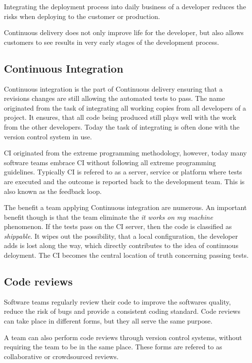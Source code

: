 Integrating the deployment process into daily business of a developer reduces
the risks when deploying to the customer or production.

Continuous delivery does not only improve life for the developer, but also
allows customers to see results in very early stages of the development
process.

\subsection{Continuous Integration}

Continuous integration is the part of Continuous delivery ensuring that a
revisions changes are still allowing the automated tests to pass. The name
originated from the task of integrating all working copies from all developers
of a project. It ensures, that all code being produced still plays well with
the work from the other developers. Today the task of integrating is often done
with the version control system in use.

CI originated from the extreme programming methodology, however, today many
software teams embrace CI without following all extreme programming guidelines.
Typically CI is refered to as a server, service or platform where tests are
executed and the outcome is reported back to the development team. This is also
known as the feedback loop.

The benefit a team applying Continuous integration are numerous. An important
benefit though is that the team eliminate the \textit{it works on my machine}
phenomenon. If the tests pass on the CI server, then the code is classified as
\textit{shippable}. It wipes out the possibility, that a local configuration,
the developer adds is lost along the way, which directly contributes to the
idea of continuous deloyment. The CI becomes the central location of truth
concerning passing tests.

\subsection{Code reviews}

Software teams regularly review their code to improve the softwares quality,
reduce the risk of bugs and provide a consistent coding standard. Code reviews
can take place in different forms, but they all serve the same purpose.

A team can also perform code reviews through version control systems, without
requiring the team to be in the same place. These forms are refered to as
collaborative or crowdsourced reviews.

